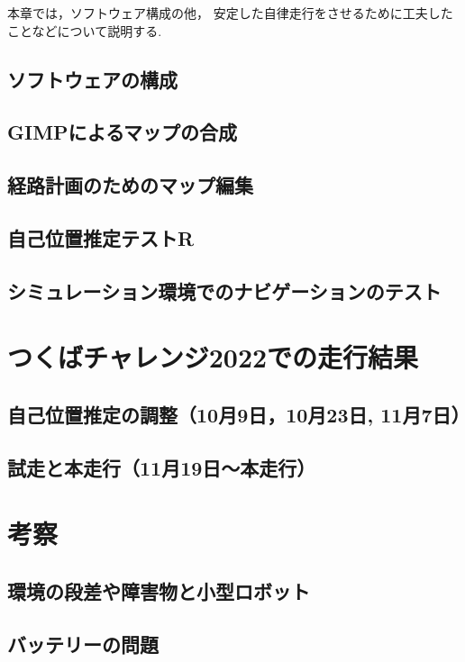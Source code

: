 \documentclass[twocolumn,9pt]{jsproceedings}
\begin{document}
本章では，ソフトウェア構成の他，
安定した自律走行をさせるために工夫したことなどについて説明する.


\subsection{ソフトウェアの構成}

\subsection{GIMPによるマップの合成}

\subsection{経路計画のためのマップ編集}


\subsection{自己位置推定テストR}

\subsection{シミュレーション環境でのナビゲーションのテスト}

\section{つくばチャレンジ2022での走行結果}

\subsection{自己位置推定の調整（10月9日，10月23日, 11月7日）}


\subsection{試走と本走行（11月19日〜本走行）}


\section{考察}

\subsection{環境の段差や障害物と小型ロボット}


\subsection{バッテリーの問題}
\end{document}
